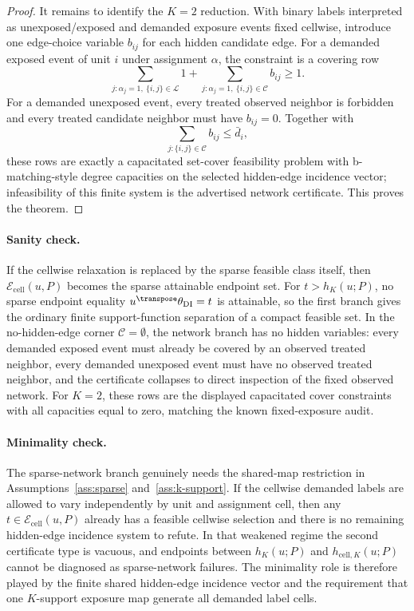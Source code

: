 \begin{proof}
It remains to identify the \(K=2\) reduction.  With binary labels interpreted as unexposed/exposed and demanded exposure events fixed cellwise, introduce one edge-choice variable \(b_{ij}\) for each hidden candidate edge.  For a demanded exposed event of unit \(i\) under assignment \(\alpha\), the constraint is a covering row
\[
\sum_{j:\alpha_j=1,\ \{i,j\}\in\mathcal L}1
+
\sum_{j:\alpha_j=1,\ \{i,j\}\in\mathcal C} b_{ij}\ge1.
\]
For a demanded unexposed event, every treated observed neighbor is forbidden and every treated candidate neighbor must have \(b_{ij}=0\).  Together with
\[
\sum_{j:\{i,j\}\in\mathcal C}b_{ij}\le\bar d_i,
\]
these rows are exactly a capacitated set-cover feasibility problem with b-matching-style degree capacities on the selected hidden-edge incidence vector; infeasibility of this finite system is the advertised network certificate.  This proves the theorem.
\end{proof}

\paragraph{Sanity check.}
If the cellwise relaxation is replaced by the sparse feasible class itself, then \(\mathcal E_{\mathrm{cell}}(u,P)\) becomes the sparse attainable endpoint set.  For \(t>h_K(u;P)\), no sparse endpoint equality \(u^\transpose\theta_{\mathrm{DI}}=t\) is attainable, so the first branch gives the ordinary finite support-function separation of a compact feasible set.  In the no-hidden-edge corner \(\mathcal C=\emptyset\), the network branch has no hidden variables: every demanded exposed event must already be covered by an observed treated neighbor, every demanded unexposed event must have no observed treated neighbor, and the certificate collapses to direct inspection of the fixed observed network.  For \(K=2\), these rows are the displayed capacitated cover constraints with all capacities equal to zero, matching the known fixed-exposure audit.

\paragraph{Minimality check.}
The sparse-network branch genuinely needs the shared-map restriction in Assumptions~\ref{ass:sparse} and~\ref{ass:k-support}.  If the cellwise demanded labels are allowed to vary independently by unit and assignment cell, then any \(t\in\mathcal E_{\mathrm{cell}}(u,P)\) already has a feasible cellwise selection and there is no remaining hidden-edge incidence system to refute.  In that weakened regime the second certificate type is vacuous, and endpoints between \(h_K(u;P)\) and \(h_{\mathrm{cell},K}(u;P)\) cannot be diagnosed as sparse-network failures.  The minimality role is therefore played by the finite shared hidden-edge incidence vector and the requirement that one \(K\)-support exposure map generate all demanded label cells.
